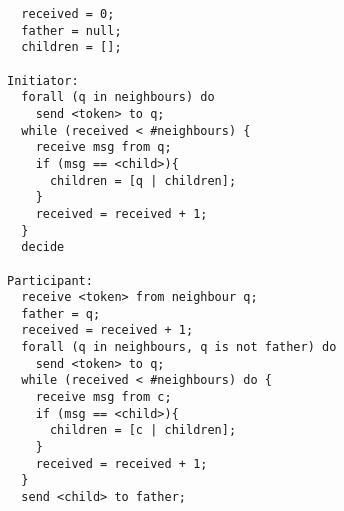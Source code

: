 \begin{verbatim}
  received = 0;
  father = null;
  children = [];

Initiator:
  forall (q in neighbours) do
    send <token> to q;
  while (received < #neighbours) {
    receive msg from q;
    if (msg == <child>){
      children = [q | children];
    }
    received = received + 1;
  }
  decide

Participant:
  receive <token> from neighbour q;
  father = q;
  received = received + 1;
  forall (q in neighbours, q is not father) do
    send <token> to q;
  while (received < #neighbours) do {
    receive msg from c;
    if (msg == <child>){
      children = [c | children];
    }
    received = received + 1;
  }
  send <child> to father;
\end{verbatim}
